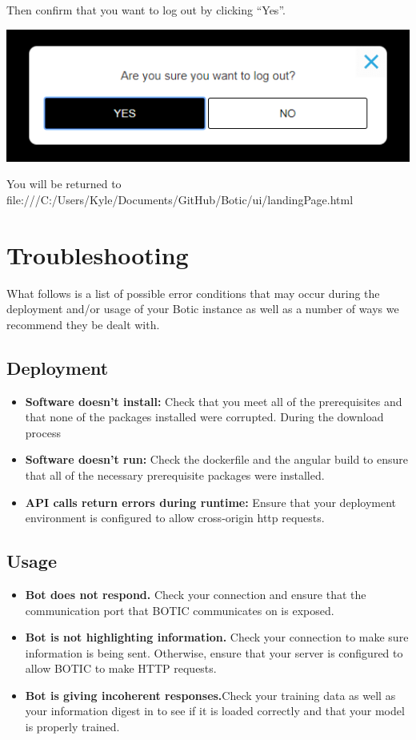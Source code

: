 \documentclass[11pt]{article}
\begin{document}
\begin{flushleft}
	Then confirm that you want to log out by clicking “Yes”.
\end{flushleft}
\includegraphics[width=1.0\textwidth]{images/Confirm.png}

\begin{flushleft}
You will be returned to file:///C:/Users/Kyle/Documents/GitHub/Botic/ui/landingPage.html
\end{flushleft}

\section{Troubleshooting}
What follows is a list of possible error conditions that may occur during the deployment and/or usage of your Botic instance as well as a number of ways we recommend they be dealt with.

\subsection{Deployment}
\begin{itemize}
    \item \textbf{Software doesn't install:} Check that you meet all of the prerequisites and that none of the packages installed were corrupted. During the download process
    \item \textbf{Software doesn't run:} Check the dockerfile and the angular build to ensure that all of the necessary prerequisite packages were installed.
    \item \textbf{API calls return errors during runtime:} Ensure that your deployment environment is configured to allow cross-origin http requests.
\end{itemize}

\subsection {Usage}
\begin{itemize}
        \item \textbf{Bot does not respond.} Check your connection and ensure that the communication port that BOTIC communicates on is exposed.
        \item\textbf{Bot is not highlighting information.} Check your connection to make sure information is being sent. Otherwise, ensure that your server is configured to allow BOTIC to make HTTP requests.
        \item \textbf{Bot is giving incoherent responses.}Check your training data as well as your information digest in to see if it is loaded correctly and that your model is properly trained.
\end{itemize}
\end{document}
